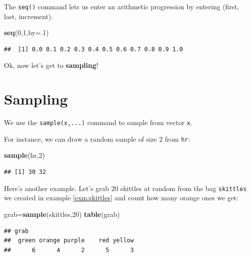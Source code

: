 \documentclass[
]{book}
\newenvironment{Shaded}{\begin{snugshade}}{\end{snugshade}}
\newcommand{\AttributeTok}[1]{\textcolor[rgb]{0.13,0.29,0.53}{#1}}
\newcommand{\DecValTok}[1]{\textcolor[rgb]{0.00,0.00,0.81}{#1}}
\newcommand{\FunctionTok}[1]{\textcolor[rgb]{0.13,0.29,0.53}{\textbf{#1}}}
\newcommand{\NormalTok}[1]{#1}
\newcommand{\OtherTok}[1]{\textcolor[rgb]{0.56,0.35,0.01}{#1}}
\theoremstyle{definition}
\theoremstyle{definition}
\theoremstyle{definition}
\theoremstyle{definition}
\theoremstyle{remark}
\begin{document}
The \texttt{seq()} command lets us enter an arithmetic progression by entering (first, last, increment).

\begin{Shaded}
\begin{Highlighting}[]
\FunctionTok{seq}\NormalTok{(}\DecValTok{0}\NormalTok{,}\DecValTok{1}\NormalTok{,}\AttributeTok{by=}\NormalTok{.}\DecValTok{1}\NormalTok{)}
\end{Highlighting}
\end{Shaded}

\begin{verbatim}
##  [1] 0.0 0.1 0.2 0.3 0.4 0.5 0.6 0.7 0.8 0.9 1.0
\end{verbatim}

Ok, now let's get to \textbf{sampling}!

\section{Sampling}\label{sampling-in-R-section}

We use the \texttt{sample(x,...)} command to sample from vector \texttt{x}.

For instance, we can draw a random sample of size 2 from \texttt{hr}:

\begin{Shaded}
\begin{Highlighting}[]
\FunctionTok{sample}\NormalTok{(hr,}\DecValTok{2}\NormalTok{)}
\end{Highlighting}
\end{Shaded}

\begin{verbatim}
## [1] 30 32
\end{verbatim}

Here's another example. Let's grab 20 skittles at random from the bag \texttt{skittles} we created in example \ref{exm:skittles} and count how many orange ones we get:

\begin{Shaded}
\begin{Highlighting}[]
\NormalTok{grab}\OtherTok{=}\FunctionTok{sample}\NormalTok{(skittles,}\DecValTok{20}\NormalTok{)}
\FunctionTok{table}\NormalTok{(grab)}
\end{Highlighting}
\end{Shaded}

\begin{verbatim}
## grab
##  green orange purple    red yellow 
##      6      4      2      5      3
\end{verbatim}
\end{document}

